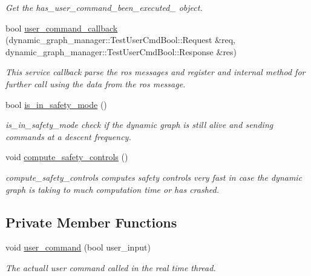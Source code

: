 \begin{DoxyCompactItemize}
\begin{DoxyCompactList}\small\item\em Get the has\+\_\+user\+\_\+command\+\_\+been\+\_\+executed\+\_\+ object. \end{DoxyCompactList}\item 
bool \hyperlink{classdynamic__graph__manager_1_1SimpleDGM_adb40055a916691d326bc6466eab9680b}{user\+\_\+command\+\_\+callback} (dynamic\+\_\+graph\+\_\+manager\+::\+Test\+User\+Cmd\+Bool\+::\+Request \&req, dynamic\+\_\+graph\+\_\+manager\+::\+Test\+User\+Cmd\+Bool\+::\+Response \&res)
\begin{DoxyCompactList}\small\item\em This service callback parse the ros messages and register and internal method for further call using the data from the ros message. \end{DoxyCompactList}\item 
bool \hyperlink{classdynamic__graph__manager_1_1SimpleDGM_a5fe81f9feb5d982761d7a427aa31e7b4}{is\+\_\+in\+\_\+safety\+\_\+mode} ()
\begin{DoxyCompactList}\small\item\em is\+\_\+in\+\_\+safety\+\_\+mode check if the dynamic graph is still alive and sending commands at a descent frequency. \end{DoxyCompactList}\item 
void \hyperlink{classdynamic__graph__manager_1_1SimpleDGM_a37b28e687ce4e724770f5c9f23da4d4f}{compute\+\_\+safety\+\_\+controls} ()\hypertarget{classdynamic__graph__manager_1_1SimpleDGM_a37b28e687ce4e724770f5c9f23da4d4f}{}\label{classdynamic__graph__manager_1_1SimpleDGM_a37b28e687ce4e724770f5c9f23da4d4f}

\begin{DoxyCompactList}\small\item\em compute\+\_\+safety\+\_\+controls computes safety controls very fast in case the dynamic graph is taking to much computation time or has crashed. \end{DoxyCompactList}\end{DoxyCompactItemize}
\subsection*{Private Member Functions}
\begin{DoxyCompactItemize}
\item 
void \hyperlink{classdynamic__graph__manager_1_1SimpleDGM_a6ba8314169c29c722cdcea810798f08d}{user\+\_\+command} (bool user\+\_\+input)
\begin{DoxyCompactList}\small\item\em The actuall user command called in the real time thread. \end{DoxyCompactList}\end{DoxyCompactItemize}
